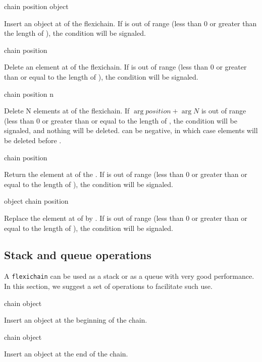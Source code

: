 \documentclass[11pt]{article}
\begin{document}
 {chain position object}

Insert an object at  of the flexichain.  If
 is out of range (less than $0$ or greater than the
length of ), the  condition will be
signaled.

 {chain position}

Delete an element at  of the flexichain.  If
 is out of range (less than $0$ or greater than or equal
to the length of ), the  condition will be
signaled.

 {chain position n}

Delete N elements at  of the flexichain. If
$\arg{position}+\arg{N}$ is out of range (less than $0$ or greater
than or equal to the length of , the
 condition will be signaled, and nothing will
be deleted.  can be negative, in which case elements will be
deleted before .

 {chain position}

Return the element at  of the .  If
 is out of range (less than $0$ or greater than or equal
to the length of ), the  condition will be
signaled.

 {object chain position}

Replace the element at  of  by .
If  is out of range (less than $0$ or greater than or
equal to the length of ), the  condition
will be signaled.

\subsection{Stack and queue operations}

A \texttt{flexichain} can be used as a stack or as a queue with very good
performance.  In this section, we suggest a set of operations to
facilitate such use. 

 {chain object}

Insert an object at the beginning of the chain.

 {chain object}

Insert an object at the end of the chain.
\end{document}
